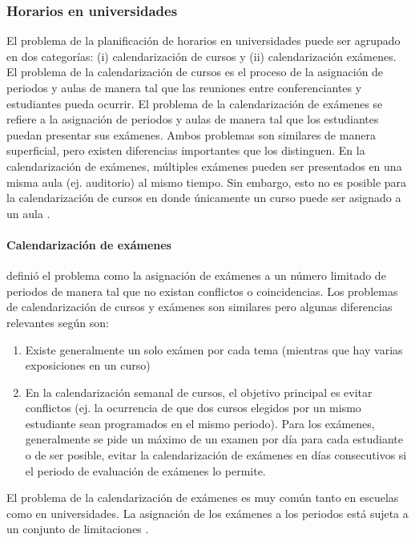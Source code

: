 \documentclass[spanish,draft,12pt,headsepline,footsepline,paper=letter]{scrreprt}
\begin{document}
\subsubsection{Horarios en universidades}

El problema de la planificación de horarios en universidades puede ser agrupado en dos categorías: (i) calendarización de cursos y (ii) calendarización exámenes.
El problema de la calendarización de cursos es el proceso de la asignación de periodos y aulas de manera tal que las reuniones entre conferenciantes y estudiantes pueda ocurrir.
El problema de la calendarización de exámenes se refiere a la asignación de periodos y aulas de manera tal que los estudiantes puedan presentar sus exámenes.
Ambos problemas son similares de manera superficial, pero existen diferencias importantes que los distinguen.
En la calendarización de exámenes, múltiples exámenes pueden ser presentados en una misma aula (ej. auditorio) al mismo tiempo.
Sin embargo, esto no es posible para la calendarización de cursos en donde únicamente un curso puede ser asignado a un aula \citep[p.~11]{abdullah06heuristic-approaches}.

\paragraph{Calendarización de exámenes}

\citet[p.~4]{carter95recent-developments} definió el problema como la asignación de exámenes a un número limitado de periodos de manera tal que no existan conflictos o coincidencias. Los problemas de calendarización de cursos y exámenes son similares pero algunas diferencias relevantes según \citet[p.~159]{werra85an-introduction-to-timetabling} son:
\begin{enumerate}[a]
\item Existe generalmente un solo exámen por cada tema (mientras que hay varias exposiciones en un curso)
\item En la calendarización semanal de cursos, el objetivo principal es evitar conflictos (ej. la ocurrencia de que dos cursos elegidos por un mismo estudiante sean programados en el mismo periodo). Para los exámenes, generalmente se pide un máximo de un examen por día para cada estudiante o de ser posible, evitar la calendarización de exámenes en días consecutivos si el periodo de evaluación de exámenes lo permite.
\end{enumerate}
El problema de la calendarización de exámenes es muy común tanto en escuelas como en universidades. La asignación de los exámenes a los periodos está sujeta a un conjunto de limitaciones \citep[p.~12]{abdullah06heuristic-approaches}.
\end{document}
